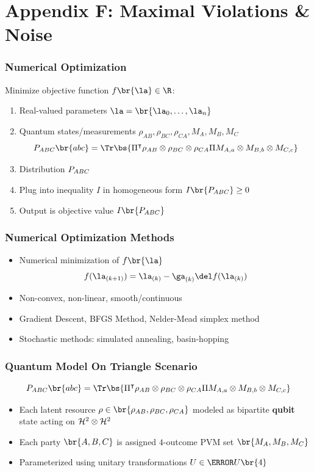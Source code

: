 \documentclass[
    hyperref={bookmarks=false},%
    xcolor={dvipsnames},
]{beamer}
\begin{document}
\section{Appendix F: Maximal Violations \& Noise}

\begin{frame}
    \frametitle{Numerical Optimization}
    Minimize objective function $f\br{\la} \in \R$:
    \begin{enumerate}
        \item Real-valued parameters $\la = \br{\la_0, \ldots, \la_n}$
        \item Quantum states/measurements $\rho_{AB}, \rho_{BC}, \rho_{CA}, M_{A}, M_{B}, M_{C}$
    \[ \prob[ABC]\br{abc} = \Tr\bs{\netperm^\intercal \rho_{AB}\otimes\rho_{BC}\otimes\rho_{CA} \netperm M_{A,a}\otimes M_{B,b} \otimes M_{C,c}} \]
        \item Distribution $\prob[ABC]$
        \item Plug into inequality $I$ in homogeneous form $I\br{\prob[ABC]} \geq 0$
        \item Output is objective value $I\br{\prob[ABC]}$
    \end{enumerate}
\end{frame}

\begin{frame}
    \frametitle{Numerical Optimization Methods}
    \begin{itemize}
        \item Numerical minimization of $f\br{\la}$
        \[ f(\la_{(k+1)}) = \la_{(k)} - \ga_{(k)} \del f(\la_{(k)})  \]
        \item Non-convex, non-linear, smooth/continuous
        \item Gradient Descent, BFGS Method, Nelder-Mead simplex method
        \item Stochastic methods: simulated annealing, basin-hopping
    \end{itemize}
\end{frame}

\begin{frame}
    \frametitle{Quantum Model On Triangle Scenario}
    \[ \prob[ABC]\br{abc} = \Tr\bs{\netperm^\intercal \rho_{AB}\otimes\rho_{BC}\otimes\rho_{CA} \netperm M_{A,a}\otimes M_{B,b} \otimes M_{C,c}} \]
    \begin{center}
        \scalebox{0.6}{}
    \end{center}
    \begin{itemize}
        \item Each latent resource $\rho \in \br{\rho_{AB}, \rho_{BC}, \rho_{CA}}$ modeled as bipartite \textbf{qubit} state acting on $\mathcal{H}^{2} \otimes \mathcal{H}^{2}$
        \item Each party $\br{A, B, C}$ is assigned $4$-outcome PVM set $\br{M_A, M_B, M_C}$
        \item Parameterized using unitary transformations $U \in \s{U}\br{4}$
    \end{itemize}
\end{frame}
\end{document}
